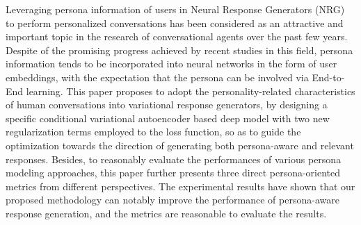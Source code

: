 Leveraging persona information of users in Neural Response Generators (NRG) to perform personalized conversations has been considered as an attractive and important topic in the research of conversational agents over the past few years. Despite of the promising progress achieved by recent studies in this field, persona information tends to be incorporated into neural networks in the form of user embeddings, with the expectation that the persona can be involved via End-to-End learning. This paper proposes to adopt the personality-related characteristics of human conversations into variational response generators, by designing a specific conditional variational autoencoder based deep model with two new regularization terms employed to the loss function, so as to guide the optimization towards the direction of generating both persona-aware and relevant responses. Besides, to reasonably evaluate the performances of various persona modeling approaches, this paper further presents three direct persona-oriented metrics from different perspectives. The experimental results have shown that our proposed methodology can notably improve the performance of persona-aware response generation, and the metrics are reasonable to evaluate the results.
